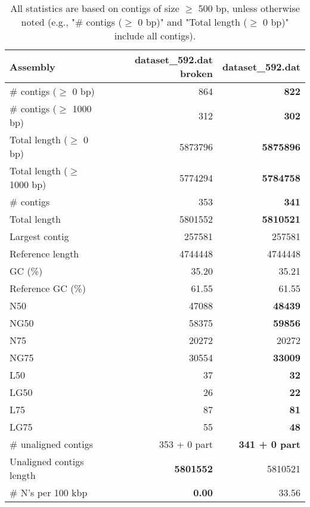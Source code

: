 \documentclass[12pt,a4paper]{article}
\begin{document}
\begin{table}[ht]
\begin{center}
\caption{All statistics are based on contigs of size $\geq$ 500 bp, unless otherwise noted (e.g., "\# contigs ($\geq$ 0 bp)" and "Total length ($\geq$ 0 bp)" include all contigs).}
\begin{tabular}{|l*{2}{|r}|}
\hline
Assembly & dataset\_592.dat broken & dataset\_592.dat \\ \hline
\# contigs ($\geq$ 0 bp) & 864 & {\bf 822} \\ \hline
\# contigs ($\geq$ 1000 bp) & 312 & {\bf 302} \\ \hline
Total length ($\geq$ 0 bp) & 5873796 & {\bf 5875896} \\ \hline
Total length ($\geq$ 1000 bp) & 5774294 & {\bf 5784758} \\ \hline
\# contigs & 353 & {\bf 341} \\ \hline
Total length & 5801552 & {\bf 5810521} \\ \hline
Largest contig & 257581 & 257581 \\ \hline
Reference length & 4744448 & 4744448 \\ \hline
GC (\%) & 35.20 & 35.21 \\ \hline
Reference GC (\%) & 61.55 & 61.55 \\ \hline
N50 & 47088 & {\bf 48439} \\ \hline
NG50 & 58375 & {\bf 59856} \\ \hline
N75 & 20272 & 20272 \\ \hline
NG75 & 30554 & {\bf 33009} \\ \hline
L50 & 37 & {\bf 32} \\ \hline
LG50 & 26 & {\bf 22} \\ \hline
L75 & 87 & {\bf 81} \\ \hline
LG75 & 55 & {\bf 48} \\ \hline
\# unaligned contigs & 353 + 0 part & {\bf 341 + 0 part} \\ \hline
Unaligned contigs length & {\bf 5801552} & 5810521 \\ \hline
\# N's per 100 kbp & {\bf 0.00} & 33.56 \\ \hline
\end{tabular}
\end{center}
\end{table}
\end{document}
